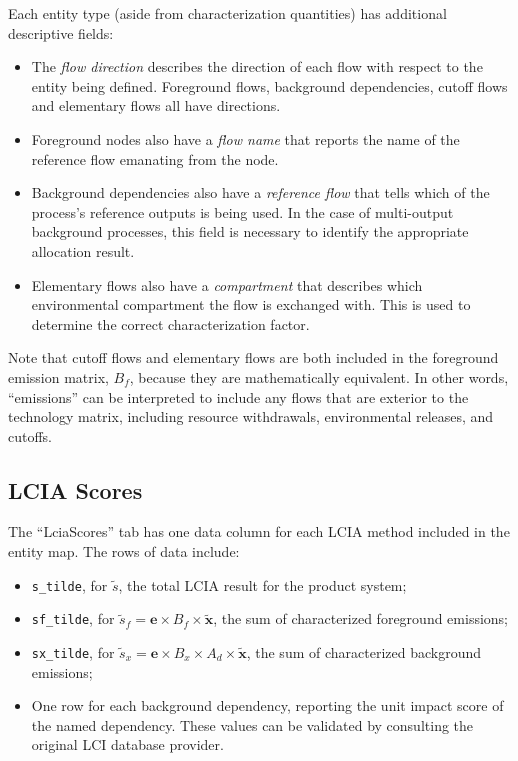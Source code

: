 Each entity type (aside from characterization quantities) has additional descriptive fields:
\begin{itemize}
\item The \emph{flow direction} describes the direction of each flow with respect to the entity being defined.  Foreground flows, background dependencies, cutoff flows and elementary flows all have directions.
\item Foreground nodes also have a \emph{flow name} that reports the name of the reference flow emanating from the node.
\item Background dependencies also have a \emph{reference flow} that tells which of the process's reference outputs is being used.  In the case of multi-output background processes, this field is necessary to identify the appropriate allocation result.
  \item Elementary flows also have a \emph{compartment} that describes which environmental compartment the flow is exchanged with. This is used to determine the correct characterization factor.
\end{itemize}
Note that cutoff flows and elementary flows are both included in the foreground emission matrix, $B_f$, because they are mathematically equivalent.  In other words, ``emissions'' can be interpreted to include any flows that are exterior to the technology matrix, including resource withdrawals, environmental releases, and cutoffs.

\subsection{LCIA Scores}

The ``LciaScores'' tab has one data column for each LCIA method included in the entity map.  The rows of data include:
\begin{itemize}
\item \texttt{s\_tilde}, for $\tilde{s}$, the total LCIA result for the product system;
\item \texttt{sf\_tilde}, for $\tilde{s}_f = \mathbf{e}\times B_f \times \tilde{\mathbf{x}}$, the sum of characterized foreground emissions;
\item \texttt{sx\_tilde}, for $\tilde{s}_x = \mathbf{e}\times B_x \times A_d \times \tilde{\mathbf{x}}$, the sum of characterized background emissions;
  \item One row for each background dependency, reporting the unit impact score of the named dependency. These values can be validated by consulting the original LCI database provider.
\end{itemize}

